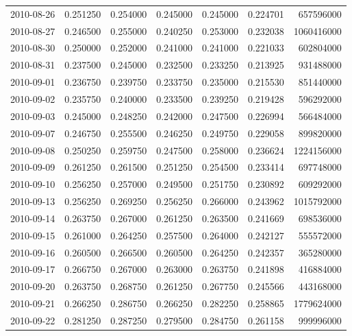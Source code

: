 \begin{tabular}{lrrrrrr}
2010-08-26 &    0.251250 &    0.254000 &    0.245000 &    0.245000 &    0.224701 &   657596000 \\
2010-08-27 &    0.246500 &    0.255000 &    0.240250 &    0.253000 &    0.232038 &  1060416000 \\
2010-08-30 &    0.250000 &    0.252000 &    0.241000 &    0.241000 &    0.221033 &   602804000 \\
2010-08-31 &    0.237500 &    0.245000 &    0.232500 &    0.233250 &    0.213925 &   931488000 \\
2010-09-01 &    0.236750 &    0.239750 &    0.233750 &    0.235000 &    0.215530 &   851440000 \\
2010-09-02 &    0.235750 &    0.240000 &    0.233500 &    0.239250 &    0.219428 &   596292000 \\
2010-09-03 &    0.245000 &    0.248250 &    0.242000 &    0.247500 &    0.226994 &   566484000 \\
2010-09-07 &    0.246750 &    0.255500 &    0.246250 &    0.249750 &    0.229058 &   899820000 \\
2010-09-08 &    0.250250 &    0.259750 &    0.247500 &    0.258000 &    0.236624 &  1224156000 \\
2010-09-09 &    0.261250 &    0.261500 &    0.251250 &    0.254500 &    0.233414 &   697748000 \\
2010-09-10 &    0.256250 &    0.257000 &    0.249500 &    0.251750 &    0.230892 &   609292000 \\
2010-09-13 &    0.256250 &    0.269250 &    0.256250 &    0.266000 &    0.243962 &  1015792000 \\
2010-09-14 &    0.263750 &    0.267000 &    0.261250 &    0.263500 &    0.241669 &   698536000 \\
2010-09-15 &    0.261000 &    0.264250 &    0.257500 &    0.264000 &    0.242127 &   555572000 \\
2010-09-16 &    0.260500 &    0.266500 &    0.260500 &    0.264250 &    0.242357 &   365280000 \\
2010-09-17 &    0.266750 &    0.267000 &    0.263000 &    0.263750 &    0.241898 &   416884000 \\
2010-09-20 &    0.263750 &    0.268750 &    0.261250 &    0.267750 &    0.245566 &   443168000 \\
2010-09-21 &    0.266250 &    0.286750 &    0.266250 &    0.282250 &    0.258865 &  1779624000 \\
2010-09-22 &    0.281250 &    0.287250 &    0.279500 &    0.284750 &    0.261158 &   999996000 \\

\end{tabular}
